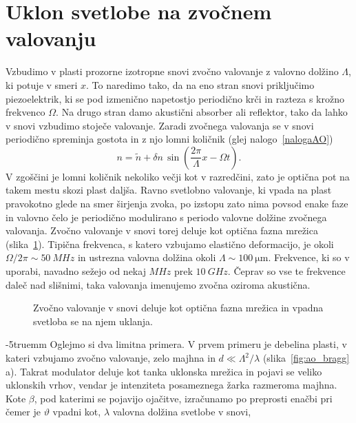 \section{Uklon svetlobe na zvočnem valovanju}
Vzbudimo v plasti prozorne izotropne snovi zvočno valovanje z valovno dolžino $\Lambda$, 
ki potuje v smeri $x$. To naredimo tako, da na eno stran snovi priključimo piezoelektrik, 
ki se pod izmenično napetostjo periodično krči in razteza s krožno frekvenco $\Omega$.
Na drugo stran damo akustični absorber ali reflektor, tako da lahko 
v snovi vzbudimo stoječe valovanje. 
Zaradi zvočnega valovanja se v snovi periodično spreminja gostota in 
z njo lomni količnik (glej nalogo~\ref{nalogaAO})
\begin{equation}
n = \tilde{n} + \delta n \,\sin \left(\frac{2\pi}{\Lambda} x- \Omega t\right).
\end{equation}
V zgoščini je lomni količnik nekoliko večji kot v razredčini, zato je optična pot na takem mestu
skozi plast daljša. Ravno svetlobno valovanje, ki vpada na plast pravokotno glede
na smer širjenja zvoka, po izstopu zato nima povsod enake faze in valovno čelo 
je periodično modulirano s periodo 
valovne dolžine zvočnega valovanja. Zvočno valovanje v snovi torej deluje kot 
optična fazna mrežica (slika~\ref{fig:ao}). Tipična frekvenca, s katero vzbujamo elastično
deformacijo, je okoli $\Omega/2\pi \sim 50~\si{MHz}$ in ustrezna valovna dolžina okoli 
$\Lambda \sim 100~\si{\micro\metre}$. Frekvence, ki so v uporabi, navadno sežejo od 
nekaj $\si{MHz}$ prek $10~\si{GHz}$. Čeprav so vse te frekvence
daleč nad slišnimi, taka valovanja imenujemo zvočna oziroma akustična. 
\begin{figure}[h]
\centering
\def\svgwidth{50truemm} 

\caption{Zvočno valovanje v snovi deluje kot optična fazna mrežica in vpadna svetloba 
se na njem uklanja.}
\label{fig:ao}
\end{figure}
\vglue-5truemm
Oglejmo si dva limitna primera. V prvem primeru je debelina plasti, 
v kateri vzbujamo zvočno valovanje, zelo majhna in 
$d \ll \Lambda^2/\lambda$ (slika~\ref{fig:ao_bragg}\,a).
Takrat modulator deluje kot tanka uklonska mrežica in pojavi se veliko 
uklonskih vrhov, vendar je intenziteta posameznega žarka razmeroma majhna. 
Kote $\beta$, pod katerimi se pojavijo ojačitve, izračunamo po preprosti enačbi
pri čemer je $\vartheta$ vpadni kot, $\lambda$ valovna dolžina svetlobe v snovi, 
